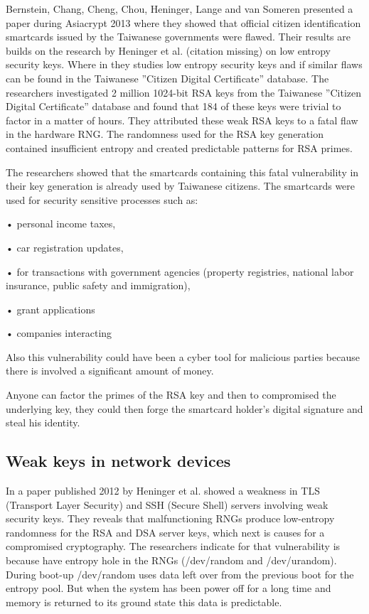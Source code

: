 \documentclass[runningheads]{llncs}
\begin{document}
Bernstein, Chang, Cheng, Chou, Heninger, Lange and van Someren presented a paper during Asiacrypt 2013 where they showed that official citizen identification smartcards issued by the Taiwanese governments were flawed. Their results are builds on the  research by Heninger et al. (citation missing) on low entropy security keys. Where in they studies low entropy security keys and if similar flaws can be found in the Taiwanese ”Citizen Digital Certificate” database. The researchers investigated 2 million 1024-bit RSA keys from the Taiwanese ”Citizen Digital Certificate” database and found that 184 of these keys were trivial to factor in a matter of hours. They attributed these weak RSA keys to a fatal flaw in the hardware RNG. The randomness used for the RSA key generation contained insufficient entropy and created predictable patterns for RSA primes.

The researchers showed that the smartcards containing this fatal vulnerability in their key generation is already used by Taiwanese citizens. The smartcards were used for security sensitive processes such as:

• personal income taxes,

• car registration updates,

• for transactions with government agencies (property registries, national labor insurance, public safety and immigration),

• grant applications

• companies interacting

Also this vulnerability could have been a cyber tool for malicious parties because there is involved a significant amount of money. 

Anyone can factor the primes of the RSA key and then to compromised the underlying key, they could then forge the smartcard holder’s digital signature and steal his identity.

\subsection{Weak keys in network devices}
\label{sub-sec:2-2}

In a paper published 2012 by Heninger et al. showed a weakness in TLS (Transport Layer Security) and SSH (Secure Shell) servers involving weak security keys. They reveals that malfunctioning RNGs produce low-entropy randomness for the RSA and DSA server keys, which next is causes for a compromised cryptography. The researchers indicate for that vulnerability is because have entropy hole in the RNGs (/dev/random and /dev/urandom). During boot-up /dev/random uses data left over from the previous boot for the entropy pool. But when the system has been power off for a long time and memory is returned to its ground state this data is predictable.
\end{document}
